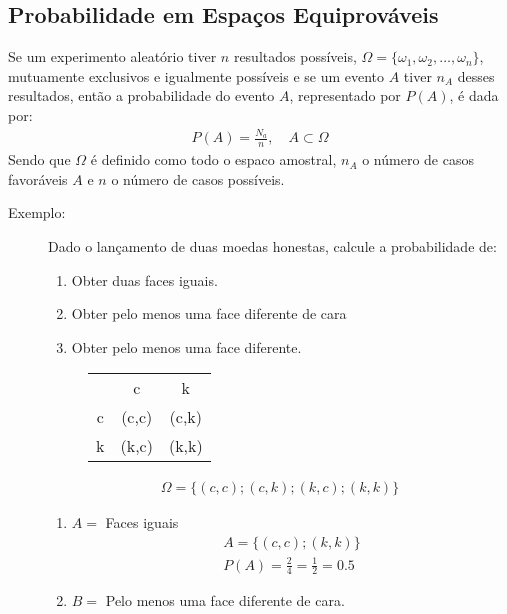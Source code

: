 \subsection{Probabilidade em Espaços Equiprováveis}
Se um experimento aleatório tiver $n$ resultados possíveis, $\Omega = \{ \omega_1,\omega_2,\ldots,\omega_n \}$, mutuamente exclusivos e igualmente possíveis e se um evento $A$ tiver $n_A$ desses resultados, então a probabilidade do evento $A$, representado por $P(A)$, é dada por: 
\begin{align}
  P(A)= \frac{N_a}{n}, \quad A \subset \Omega 
\end{align}
Sendo que $\Omega$ é definido como todo o espaco amostral, $n_A$ o número de casos favoráveis $A$ e $n$ o número de casos possíveis.

\begin{description}
  \item [Exemplo:] 

    Dado o lançamento de duas moedas honestas, calcule a probabilidade de: 
    \begin{enumerate}[label=(\alph*)]
      \item  Obter duas faces iguais.
      \item Obter pelo menos uma face diferente de cara
      \item  Obter pelo menos uma face diferente.
    \end{enumerate}
    \begin{figure} [H]
      \centering
      \begin{tabular}{c c c}
        \toprule
        &c&k\\ \cmidrule{2-3}
        c&(c,c)&(c,k)\\ \cmidrule{2-3}
        k&(k,c)&(k,k)\\    \bottomrule
      \end{tabular}
      \label{tab:1}
    \end{figure}
    \begin{align*}    \Omega = \{ (c,c); (c,k) ; (k,c) ; (k,k)\}
    \end{align*}
    \begin{enumerate}[label=(\alph*)]
      \item $A=$ Faces iguais
        \begin{align*}
          A= \{ (c,c) ; (k,k) \} \\
          P(A) = \frac{2}{4} = \frac{1}{2}= 0.5
        \end{align*}
      \item $B=$ Pelo menos uma face diferente de cara.


\end{enumerate}
\end{description}
